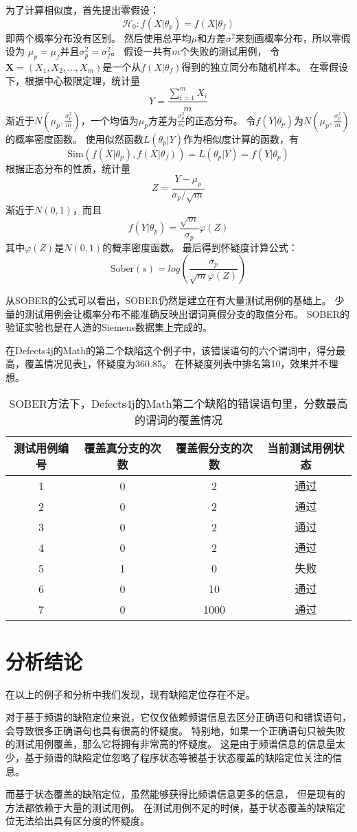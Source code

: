 为了计算相似度，首先提出零假设：
$$\mathcal{H}_0 : f(X|\theta_p) = f(X|\theta_f)$$
即两个概率分布没有区别。
然后使用总平均$\mu$和方差$\sigma^2$来刻画概率分布，所以零假设为
$\mu_p = \mu_f$并且$\sigma_p^2 = \sigma_f^2$。
假设一共有$m$个失败的测试用例，
令$\textbf{X} = (X_1, X_2, ..., X_m)$是一个从$f(X|\theta_f)$得到的独立同分布随机样本。
在零假设下，根据中心极限定理，统计量
$$
Y = \frac{\sum_{i = 1}^m X_i}{m}
$$
渐近于$N(\mu_p, \frac{\sigma_p^2}{m})$，一个均值为$\mu_p$方差为$\frac{\sigma_p^2}{m}$的正态分布。
令$f(Y|\theta_p)$为$N(\mu_p, \frac{\sigma_p^2}{m})$的概率密度函数。
使用似然函数$L(\theta_p | Y)$作为相似度计算的函数，有
$$
\mathrm{Sim}(f(X|\theta_p), f(X|\theta_f)) = L(\theta_p | Y) = f(Y|\theta_p)
$$
根据正态分布的性质，统计量
$$
Z = \frac{Y - \mu_p}{\sigma_p / \sqrt{m}}
$$
渐近于$N(0,1)$，而且
$$
f(Y|\theta_p) = \frac{\sqrt{m}}{\sigma_p}\varphi(Z)
$$
其中$\varphi(Z)$是$N(0,1)$的概率密度函数。
最后得到怀疑度计算公式：
$$
\mathrm{Sober}(s) = log\left( \frac{\sigma_p}{\sqrt{m}\varphi(Z)} \right)\label{eq:sober}
$$

从SOBER的公式可以看出，SOBER仍然是建立在有大量测试用例的基础上。
少量的测试用例会让概率分布不能准确反映出谓词真假分支的取值分布。
SOBER的验证实验也是在人造的Siemens数据集上完成的。

在Defects4j的Math的第二个缺陷这个例子中，该错误语句的六个谓词中，得分最高，覆盖情况见表\ref{math_2_sober}，怀疑度为360.85。
在怀疑度列表中排名第10，效果并不理想。

\begin{table}
\centering
\begin{tabular}{|c|c|c|c|}
\hline
测试用例编号 & 覆盖真分支的次数 & 覆盖假分支的次数 & 当前测试用例状态 \\
\hline
1 & 0 & 2 & 通过 \\
\hline
2 & 0 & 2 & 通过 \\
\hline
3 & 0 & 2 & 通过 \\
\hline
4 & 0 & 2 & 通过 \\
\hline
5 & 1 & 0 & 失败 \\
\hline
6 & 0 & 10 & 通过 \\
\hline
7 & 0 & 1000 & 通过 \\
\hline
\end{tabular}
\caption{SOBER方法下，Defects4j的Math第二个缺陷的错误语句里，分数最高的谓词的覆盖情况}
\label{math_2_sober}
\end{table}

\section{分析结论}

在以上的例子和分析中我们发现，现有缺陷定位存在不足。

对于基于频谱的缺陷定位来说，它仅仅依赖频谱信息去区分正确语句和错误语句，
会导致很多正确语句也具有很高的怀疑度。
特别地，如果一个正确语句只被失败的测试用例覆盖，那么它将拥有非常高的怀疑度。
这是由于频谱信息的信息量太少，基于频谱的缺陷定位忽略了程序状态等被基于状态覆盖的缺陷定位关注的信息。

而基于状态覆盖的缺陷定位，虽然能够获得比频谱信息更多的信息，
但是现有的方法都依赖于大量的测试用例。
在测试用例不足的时候，基于状态覆盖的缺陷定位无法给出具有区分度的怀疑度。
